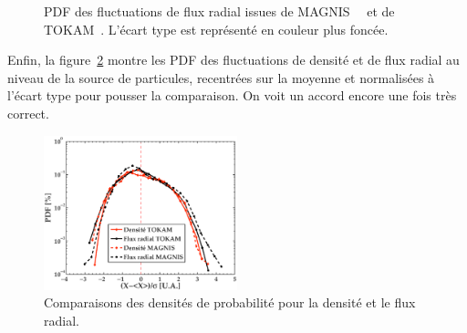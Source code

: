 \begin{refsection}
\begin{figure}[!htb]
  \centering
    \caption{PDF des fluctuations de
    flux radial issues de MAGNIS~~ et de 
    TOKAM~. L'écart type est représenté en couleur plus
    foncée.}
    \label{4-TokamPdfFlux}
\end{figure}

Enfin, la figure~\ref{4-TokamPDFDensite} montre les PDF des fluctuations de densité
et de flux radial au niveau de la source de particules, recentrées
sur la moyenne et normalisées à l'écart type pour pousser la comparaison. On
voit un accord encore une fois très correct.

 \begin{figure}[!htbp]
\centering
\includegraphics[width=0.5\textwidth]{figures/4-TokamPDFDensite.eps}
{\caption{Comparaisons des densités de probabilité pour la densité et
le flux radial.}
\label{4-TokamPDFDensite}}
\end{figure}


\end{refsection}
